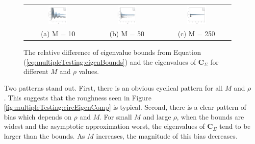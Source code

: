 \documentclass[letterpaper,12pt,oneside,final]{article}
\newcommand{\m}[1]{\mathbf{#1}}               %
\begin{document}
\begin{figure}[htp]
\begin{center}
\begin{tabular}{ccc}
\includegraphics[width = 0.30\textwidth]{./img/m10eigDiffs.png} &
\includegraphics[width = 0.30\textwidth]{./img/m50eigDiffs.png} &
\includegraphics[width = 0.30\textwidth]{./img/m250eigDiffs.png}
\\
{\footnotesize  (a) M = 10 } &  
{\footnotesize  (b) M = 50 }&
{\footnotesize  (c) M = 250 }
\end{tabular}
\end{center}
\caption{The relative difference of eigenvalue bounds from Equation (\ref{eq:multipleTesting:eigenBounds}) and the eigenvalues of $\m{C}_{\Sigma}$ for different $M$ and $\rho$ values.}
\label{fig:multipleTesting:circEigDiff}
\end{figure}

Two patterns stand out. First, there is an obvious cyclical pattern for all $M$ and $\rho$. This suggests that the roughness seen in Figure \ref{fig:multipleTesting:circEigenComp} is typical. Second, there is a clear pattern of bias which depends on $\rho$ and $M$. For small $M$ and large $\rho$, when the bounds are widest and the asymptotic approximation worst, the eigenvalues of $\m{C}_{\Sigma}$ tend to be larger than the bounds. As $M$ increases, the magnitude of this bias decreases.
\end{document}
